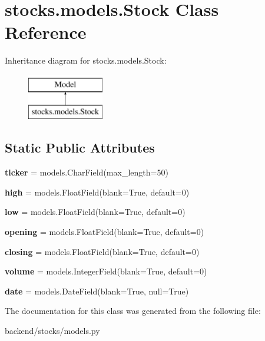 \hypertarget{classstocks_1_1models_1_1_stock}{}\section{stocks.\+models.\+Stock Class Reference}
\label{classstocks_1_1models_1_1_stock}
Inheritance diagram for stocks.\+models.\+Stock\+:\begin{figure}[H]
\begin{center}
\leavevmode
\includegraphics[height=2.000000cm]{classstocks_1_1models_1_1_stock}
\end{center}
\end{figure}
\subsection*{Static Public Attributes}
\begin{DoxyCompactItemize}
\item 
\mbox{\label{classstocks_1_1models_1_1_stock_ad5b5e27b467a6d2ea2665ae7a1de579f}} 
{\bfseries ticker} = models.\+Char\+Field(max\+\_\+length=50)
\item 
\mbox{\label{classstocks_1_1models_1_1_stock_afdadd827c199a742894ff1d25f4d238c}} 
{\bfseries high} = models.\+Float\+Field(blank=True, default=0)
\item 
\mbox{\label{classstocks_1_1models_1_1_stock_a9a64db423ee7f46e30860665d5b9a1d8}} 
{\bfseries low} = models.\+Float\+Field(blank=True, default=0)
\item 
\mbox{\label{classstocks_1_1models_1_1_stock_a75d1102df2e6a2f79ee8ebff75500037}} 
{\bfseries opening} = models.\+Float\+Field(blank=True, default=0)
\item 
\mbox{\label{classstocks_1_1models_1_1_stock_a6d906d6ae8aa32a7009474f9a9a78bf4}} 
{\bfseries closing} = models.\+Float\+Field(blank=True, default=0)
\item 
\mbox{\label{classstocks_1_1models_1_1_stock_a1c43b12207da4c6b6d06a9acf4e1fe20}} 
{\bfseries volume} = models.\+Integer\+Field(blank=True, default=0)
\item 
\mbox{\label{classstocks_1_1models_1_1_stock_a4d79a50425afd2fe02c6e03a32161be9}} 
{\bfseries date} = models.\+Date\+Field(blank=True, null=True)
\end{DoxyCompactItemize}


The documentation for this class was generated from the following file\+:\begin{DoxyCompactItemize}
\item 
backend/stocks/models.\+py\end{DoxyCompactItemize}
